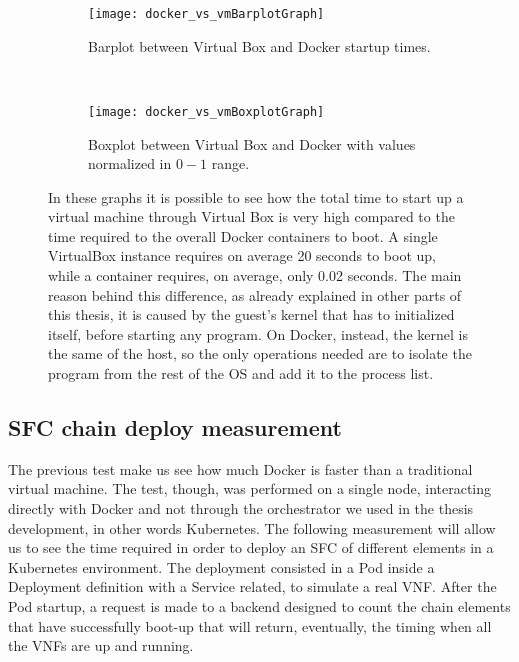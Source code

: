 \begin{figure}[t]
    \centering
    \begin{subfigure}[b]{0.4\textwidth}
        \texttt{[image: docker\_vs\_vmBarplotGraph]}
        \caption{Barplot between Virtual Box and Docker startup times.}
        \label{chap:tests:sec:dockervsvb:img:barplot}
    \end{subfigure}
    ~
    \begin{subfigure}[b]{0.4\textwidth}
        \texttt{[image: docker\_vs\_vmBoxplotGraph]}
        \caption{Boxplot between Virtual Box and Docker with values normalized 
in $0-1$ range.}
        \label{chap:tests:sec:dockervsvb:img:boxplot}
    \end{subfigure}
    \caption[Virtual Box vs Docker start up comparison]{In these graphs it is 
possible to see how the total time to start up a virtual machine through Virtual 
Box is very high compared to the time required to the overall Docker containers 
to boot. A single VirtualBox instance requires on average 20 seconds to boot up, 
while a container requires, on average, only 0.02 seconds. The main reason 
behind this difference, as already explained in other parts of this thesis, it 
is caused by the guest's kernel that has to initialized itself, before starting 
any program. On Docker, instead, the kernel is the same of the host, so the only 
operations needed are to isolate the program from the rest of the OS and add it 
to the process list.}
    \label{chap:tests:sec:dockervsvb:subimg:plots}
\end{figure}

\subsection{SFC chain deploy measurement}

The previous test make us see how much Docker is faster than a traditional
virtual machine. The test, though, was performed on a single node, interacting
directly with Docker and not through the orchestrator we used in the thesis
development, in other words Kubernetes. The following measurement will allow us
to see the time required in order to deploy an SFC of different elements in a
Kubernetes environment. The deployment consisted in a Pod inside a Deployment
definition with a Service related, to simulate a real VNF. After the Pod
startup, a request is made to a backend designed to count the chain elements
that have successfully boot-up that will return, eventually, the timing when all
the VNFs are up and running.

